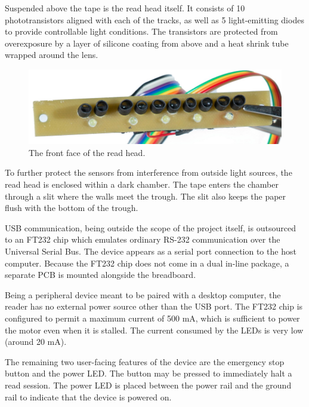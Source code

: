 \documentclass{article}
\begin{document}
	\newpage
	
	Suspended above the tape is the read head itself. It consists of 10
	phototransistors aligned with each of the tracks, as well as 5
	light-emitting diodes to provide controllable light conditions. The
	transistors are protected from overexposure by a layer of silicone coating
	from above and a heat shrink tube wrapped around the lens.
	
	\begin{figure}[h]
		\begin{center}
			\includegraphics[width=0.75\linewidth]{img/readhead}
			\caption{The front face of the read head.}
			\label{fig:readhead}
		\end{center}
	\end{figure}
	
	To further protect the sensors from interference from outside light
	sources, the read head is enclosed within a dark chamber. The tape enters
	the chamber through a slit where the walls meet the trough. The slit also
	keeps the paper flush with the bottom of the trough.
	
	USB communication, being outside the scope of the project itself, is
	outsourced to an FT232 chip which emulates ordinary RS-232 communication
	over the Universal Serial Bus. The device appears as a serial port
	connection to the host computer. Because the FT232 chip does not come in a
	dual in-line package, a separate PCB is mounted alongside the breadboard.
	
	Being a peripheral device meant to be paired with a desktop computer, the
	reader has no external power source other than the USB port. The FT232 chip
	is configured to permit a maximum current of 500 mA, which is sufficient to
	power the motor even when it is stalled. The current consumed by the LEDs
	is very low (around 20 mA).
	
	The remaining two user-facing features of the device are the emergency stop
	button and the power LED. The button may be pressed to immediately halt a
	read session. The power LED is placed between the power rail and the ground
	rail to indicate that the device is powered on.
	
\end{document}
